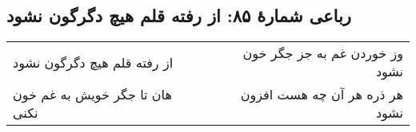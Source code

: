 \begin{center}
\section*{رباعی شمارهٔ ۸۵: از رفته قلم هیچ دگرگون نشود}
\label{sec:085}
\begin{longtable}{l p{0.5cm} r}
از رفته قلم هیچ دگرگون نشود
&&
وز خوردن غم به جز جگر خون نشود
\\
هان تا جگر خویش به غم خون نکنی
&&
هر ذره هر آن چه  هست افزون نشود
\\
\end{longtable}
\end{center}
